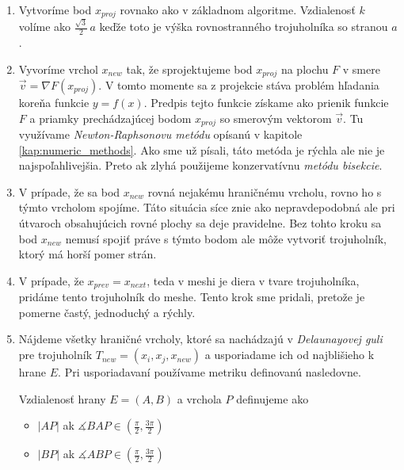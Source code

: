 \begin{enumerate}
    \item{
        Vytvoríme bod $x_{proj}$ rovnako ako v základnom algoritme. Vzdialenosť $k$ volíme
        ako $\frac{\sqrt 3}{2} \, a$ keďže toto je výška rovnostranného trojuholníka so stranou $a$.
    }
    \item{
        Vyvoríme vrchol $x_{new}$ tak, že sprojektujeme bod $x_{proj}$ na plochu $F$ v smere 
        $\overrightarrow{v} = \nabla F(x_{proj})$. V tomto momente sa z projekcie 
        stáva problém hľadania koreňa funkcie $y = f(x)$. Predpis tejto funkcie získame ako prienik 
        funkcie $F$ a priamky prechádzajúcej bodom $x_{proj}$ so smerovým vektorom $\overrightarrow{v}$. 
        Tu využívame
        \textit{Newton-Raphsonovu metódu} opísanú v kapitole \ref{kap:numeric_methods}. Ako sme 
        už písali, táto metóda je rýchla ale nie je najspoľahlivejšia. Preto ak zlyhá
        použijeme konzervatívnu \textit{metódu bisekcie}.
    }
    \item{
        V prípade, že sa bod $x_{new}$ rovná nejakému hraničnému vrcholu, rovno ho s týmto vrcholom
        spojíme. Táto situácia síce znie ako nepravdepodobná ale pri útvaroch obsahujúcich rovné plochy sa
        deje pravidelne. Bez tohto kroku sa bod $x_{new}$ nemusí spojiť práve s týmto bodom ale
        môže vytvoriť trojuholník, ktorý má horší pomer strán.
    }
    \item{
        V prípade, že $x_{prev} = x_{next}$, teda v meshi je diera v tvare trojuholníka, pridáme tento 
        trojuholník do meshe. Tento krok sme pridali, pretože je pomerne častý, jednoduchý a rýchly.
    }
    \item{
        Nájdeme všetky hraničné vrcholy, ktoré sa nachádzajú v \textit{Delaunayovej guli} pre trojuholník 
        $T_{new} = (x_i, x_j, x_{new})$ a usporiadame ich od najblišieho k hrane $E$. Pri usporiadavaní 
        používame metriku definovanú nasledovne.

        \begin{definition} Vzdialenosť hrany $E=(A,B)$ a vrchola $P$ definujeme ako
        \label{def:segment_point_distance}
        \begin{itemize}
            \item{
                $|AP|$ ak $\measuredangle BAP \in (\frac{\pi}{2}, \frac{3\pi}{2})$
            }

            \item{
                $|BP|$ ak $\measuredangle ABP \in (\frac{\pi}{2}, \frac{3\pi}{2})$
            }


\end{itemize}
\end{definition}}
\end{enumerate}
